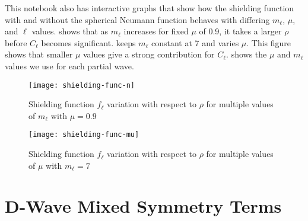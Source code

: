 \documentclass[Dissertation.tex]{subfiles}
\begin{document}
This notebook also has interactive graphs that show how the shielding function
with and without the spherical Neumann function behaves with differing $m_\ell$,
$\mu$, and $\ell$ values.  shows that as $m_\ell$
increases for fixed $\mu$ of 0.9, it takes a larger $\rho$ before $C_\ell$
becomes significant.  keeps $m_\ell$ constant at 7
and varies $\mu$. This figure shows that smaller $\mu$ values give a strong
contribution for $C_\ell$.  shows the $\mu$ and $m_\ell$
values we use for each partial wave.
\begin{figure}
	\centering
	\texttt{[image: shielding-func-n]}
	\caption[Shielding function $f_\ell$ variation with respect to $\rho$ for multiple values of $m_\ell$]{Shielding function $f_\ell$ variation with respect to $\rho$ for multiple values of $m_\ell$ with $\mu = 0.9$}
	\label{fig:shielding-func-n}
\end{figure}
\begin{figure}
	\centering
	\texttt{[image: shielding-func-mu]}
	\caption[Shielding function $f_\ell$ variation with respect to $\rho$ for multiple values of $\mu$]{Shielding function $f_\ell$ variation with respect to $\rho$ for multiple values of $\mu$ with $m_\ell = 7$}
	\label{fig:shielding-func-mu}
\end{figure}


\section{D-Wave Mixed Symmetry Terms}
\label{sec:MixedDerivation}
\end{document}
